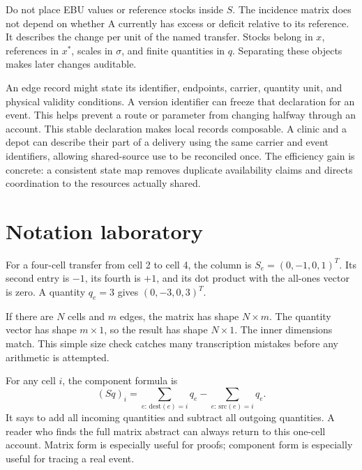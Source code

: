 Do not place EBU values or reference stocks inside \(S\). The incidence matrix does not depend on whether A currently has excess or deficit relative to its reference. It describes the change per unit of the named transfer. Stocks belong in \(x\), references in \(x^*\), scales in \(\sigma\), and finite quantities in \(q\). Separating these objects makes later changes auditable.

An edge record might state its identifier, endpoints, carrier, quantity unit, and physical validity conditions. A version identifier can freeze that declaration for an event. This helps prevent a route or parameter from changing halfway through an account. This stable declaration makes local records composable. A clinic and a depot can describe their part of a delivery using the same carrier and event identifiers, allowing shared-source use to be reconciled once. The efficiency gain is concrete: a consistent state map removes duplicate availability claims and directs coordination to the resources actually shared.

\section{Notation laboratory}
For a four-cell transfer from cell 2 to cell 4, the column is \(S_e=(0,-1,0,1)^T\). Its second entry is \(-1\), its fourth is \(+1\), and its dot product with the all-ones vector is zero. A quantity \(q_e=3\) gives \((0,-3,0,3)^T\).

If there are \(N\) cells and \(m\) edges, the matrix has shape \(N\times m\). The quantity vector has shape \(m\times1\), so the result has shape \(N\times1\). The inner dimensions match. This simple size check catches many transcription mistakes before any arithmetic is attempted.

For any cell \(i\), the component formula is
\begin{equation}
 (Sq)_i=\sum_{e:\,\mathrm{dest}(e)=i}q_e
       -\sum_{e:\,\mathrm{src}(e)=i}q_e.
\end{equation}
It says to add all incoming quantities and subtract all outgoing quantities. A reader who finds the full matrix abstract can always return to this one-cell account. Matrix form is especially useful for proofs; component form is especially useful for tracing a real event.

